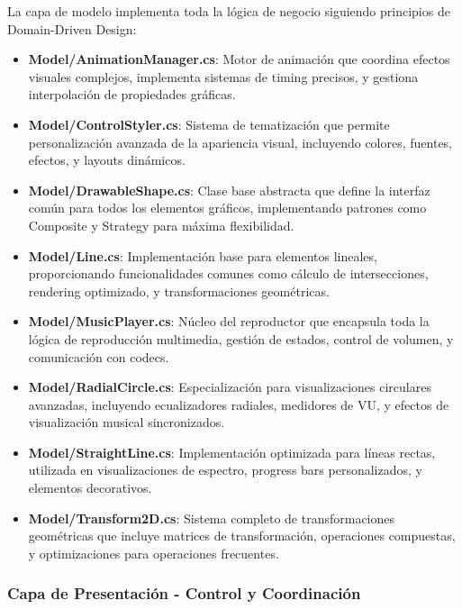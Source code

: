 \documentclass[a4paper]{article}
\begin{document}
La capa de modelo implementa toda la lógica de negocio siguiendo principios de Domain-Driven Design:

\begin{itemize}
\item \textbf{Model/AnimationManager.cs}: Motor de animación que coordina efectos visuales complejos, implementa sistemas de timing precisos, y gestiona interpolación de propiedades gráficas.

\item \textbf{Model/ControlStyler.cs}: Sistema de tematización que permite personalización avanzada de la apariencia visual, incluyendo colores, fuentes, efectos, y layouts dinámicos.

\item \textbf{Model/DrawableShape.cs}: Clase base abstracta que define la interfaz común para todos los elementos gráficos, implementando patrones como Composite y Strategy para máxima flexibilidad.

\item \textbf{Model/Line.cs}: Implementación base para elementos lineales, proporcionando funcionalidades comunes como cálculo de intersecciones, rendering optimizado, y transformaciones geométricas.

\item \textbf{Model/MusicPlayer.cs}: Núcleo del reproductor que encapsula toda la lógica de reproducción multimedia, gestión de estados, control de volumen, y comunicación con codecs.

\item \textbf{Model/RadialCircle.cs}: Especialización para visualizaciones circulares avanzadas, incluyendo ecualizadores radiales, medidores de VU, y efectos de visualización musical sincronizados.

\item \textbf{Model/StraightLine.cs}: Implementación optimizada para líneas rectas, utilizada en visualizaciones de espectro, progress bars personalizados, y elementos decorativos.

\item \textbf{Model/Transform2D.cs}: Sistema completo de transformaciones geométricas que incluye matrices de transformación, operaciones compuestas, y optimizaciones para operaciones frecuentes.
\end{itemize}

\subsubsection{Capa de Presentación - Control y Coordinación}
\end{document}
